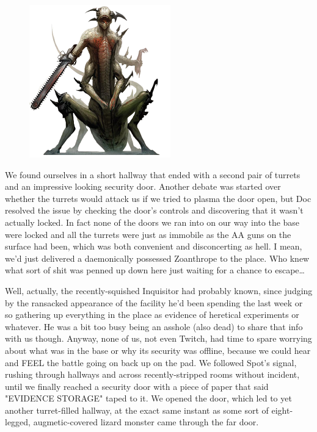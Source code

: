 \begin{figure}
	\begin{center}
		\includegraphics[width=\figwidth]{pics/16/21.png}
	\end{center}
\end{figure}
We found ourselves in a short hallway that ended with a second pair of turrets and an impressive looking security door. 
Another debate was started over whether the turrets would attack us if we tried to plasma the door open, but Doc resolved the issue by checking the door's controls and discovering that it wasn't actually locked. 
In fact none of the doors we ran into on our way into the base were locked and all the turrets were just as immobile as the AA guns on the surface had been, which was both convenient and disconcerting as hell. 
I mean, we'd just delivered a daemonically possessed Zoanthrope to the place. 
Who knew what sort of shit was penned up down here just waiting for a chance to escape…

Well, actually, the recently-squished Inquisitor had probably known, since judging by the ransacked appearance of the facility he'd been spending the last week or so gathering up everything in the place as evidence of heretical experiments or whatever. 
He was a bit too busy being an asshole (also dead) to share that info with us though. 
Anyway, none of us, not even Twitch, had time to spare worrying about what was in the base or why its security was offline, because we could hear and FEEL the battle going on back up on the pad. 
We followed Spot's signal, rushing through hallways and across recently-stripped rooms without incident, until we finally reached a security door with a piece of paper that said "EVIDENCE STORAGE" taped to it. 
We opened the door, which led to yet another turret-filled hallway, at the exact same instant as some sort of eight-legged, augmetic-covered lizard monster came through the far door.

